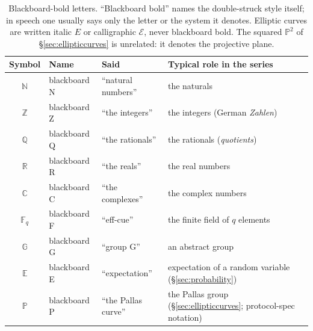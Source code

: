\documentclass[11pt,a4paper]{article}
\theoremstyle{definition}
\theoremstyle{remark}
\newcommand{\N}{\ensuremath{\mathbb{N}}}
\newcommand{\Z}{\ensuremath{\mathbb{Z}}}
\newcommand{\Q}{\ensuremath{\mathbb{Q}}}
\newcommand{\R}{\ensuremath{\mathbb{R}}}
\providecommand{\C}{}\renewcommand{\C}{\ensuremath{\mathbb{C}}}
\newcommand{\F}{\ensuremath{\mathbb{F}}}
\newcommand{\G}{\ensuremath{\mathbb{G}}}
\newcommand{\E}{\ensuremath{\mathbb{E}}}
\begin{document}
\begin{table}[ht]
\centering
\small
\begin{tabular}{@{}clll@{}}
\toprule
Symbol & Name & Said & Typical role in the series \\
\midrule
\(\N\) & blackboard N & ``natural numbers'' & the naturals \\
\(\Z\) & blackboard Z & ``the integers'' & the integers
  (German \emph{Zahlen}) \\
\(\Q\) & blackboard Q & ``the rationals'' & the rationals (\emph{quotients}) \\
\(\R\) & blackboard R & ``the reals'' & the real numbers \\
\(\C\) & blackboard C & ``the complexes'' & the complex numbers \\
\(\F_q\) & blackboard F & ``eff-cue'' & the finite field of \(q\) elements \\
\(\G\) & blackboard G & ``group G'' & an abstract group \\
\(\E\) & blackboard E & ``expectation'' & expectation of a random
  variable (\S\ref{sec:probability}) \\
\(\mathbb{P}\) & blackboard P & ``the Pallas curve'' & the Pallas group
  (\S\ref{sec:ellipticcurves}; protocol-spec notation) \\
\bottomrule
\end{tabular}
\caption{Blackboard-bold letters. ``Blackboard bold'' names the double-struck
style itself; in speech one usually says only the letter or the system it
denotes. Elliptic curves are written italic \(E\) or calligraphic
\(\mathcal{E}\), never blackboard bold. The squared \(\mathbb{P}^2\) of
\S\ref{sec:ellipticcurves} is unrelated: it denotes the projective plane.}
\label{tab:notation-bb}
\end{table}
\end{document}
